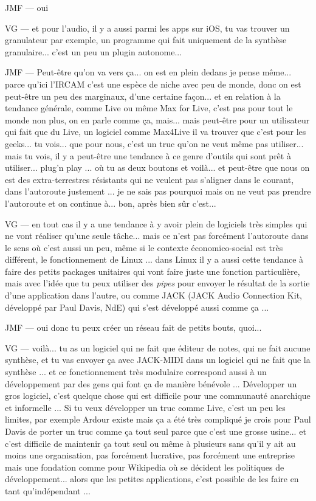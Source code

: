 JMF — oui 

VG — et pour l'audio, il y a aussi parmi les apps sur iOS, tu vas trouver un granulateur par exemple, un programme qui fait uniquement de la synthèse granulaire... c'est un peu un plugin autonome...  

JMF — Peut-être qu'on va vers ça... on est en plein dedans je pense même... parce qu'ici l'IRCAM c'est une espèce de niche avec peu de monde, donc on est peut-être un peu des marginaux, d'une certaine façon... et en relation à la tendance générale, comme Live ou même Max for Live, c'est pas pour tout le monde non plus, on en parle comme ça, mais... mais peut-être pour un utilisateur qui fait que du Live, un logiciel comme Max4Live il va trouver que c'est pour les geeks... tu vois... que pour nous, c'est un truc qu'on ne veut même pas utiliser... mais tu vois, il y a peut-être une tendance à ce genre d'outils qui sont prêt à utiliser... plug'n play ... où tu as deux boutons et voilà... et peut-être que nous on est des extra-terrestres résistants qui ne veulent pas s'aligner dans le courant, dans l'autoroute justement ... je ne sais pas pourquoi mais on ne veut pas prendre l'autoroute et on continue à... bon, après bien sûr c'est... 

VG — en tout cas il y a une tendance à y avoir plein de logiciels très simples qui ne vont réaliser qu'une seule tâche... mais ce n'est pas forcément l'autoroute dans le sens où c'est aussi un peu, même si le contexte économico-social est très différent, le fonctionnement de Linux ... dans Linux il y a aussi cette tendance à faire des petits packages unitaires qui vont faire juste une fonction particulière, mais avec l'idée que tu peux utiliser des \textit{pipes} pour envoyer le résultat de la sortie d'une application dans l'autre, ou comme JACK (JACK Audio Connection Kit, développé par Paul Davis, NdE) qui s'est développé aussi comme ça ... 

JMF — oui donc tu peux créer un réseau fait de petits bouts, quoi... 

VG — voilà... tu as un logiciel qui ne fait que éditeur de notes, qui ne fait aucune synthèse, et tu vas envoyer ça avec JACK-MIDI dans un logiciel qui ne fait que la synthèse ... et ce fonctionnement très modulaire correspond aussi à un développement par des gens qui font ça de manière bénévole ... Développer un gros logiciel, c'est quelque chose qui est difficile pour une communauté anarchique et informelle ... Si tu veux développer un truc comme Live, c'est un peu les limites, par exemple Ardour existe mais ça a été très compliqué je crois pour Paul Davis de porter un truc comme ça tout seul parce que c'est une grosse usine... et c'est difficile de maintenir ça tout seul ou même à plusieurs sans qu'il y ait au moins une organisation, pas forcément lucrative, pas forcément une entreprise mais une fondation comme pour Wikipedia où se décident les politiques de développement... alors que les petites applications, c'est possible de les faire en tant qu'indépendant ...  

